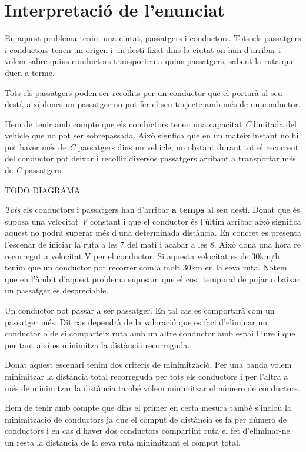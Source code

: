 \section{Interpretació de l'enunciat}

En aquest problema tenim una ciutat, passatgers i conductors. Tots els passatgers i conductors
tenen un origen i un destí fixat dins la ciutat on han d'arribar i volem sabre quins conductors
transporten a quins passatgers, sabent la ruta que duen a terme.

Tots els passatgers poden ser recollits per un conductor que el portarà al seu destí,
així doncs un passatger no pot fer el seu tarjecte amb més de un conductor.

Hem de tenir amb compte que els conductors tenen una capacitat \emph{C} limitada del vehicle que no pot ser
sobrepassada. Això signfica que en un mateix instant no hi pot haver més de \emph{C} passatgers dins un vehicle,
no obstant durant tot el recorreut del conductor pot deixar i recollir diversos passatgers arribant a transportar
més de \emph{C} passatgers.


TODO DIAGRAMA

\emph{Tots} els conductors i passatgers han d'arribar \textbf{a temps} al seu destí. Donat que és
suposa una velocitat \emph{V} constant i que el conductor és l'últim arribar això significa aquest no podrà
superar més d'una determinada distància. En concret es presenta l'escenar de iniciar la ruta a les 7 del mati
i acabar a les 8. Això dona una hora re recorregut a velocitat V per el conductor. Si aquesta velocitat es
de 30km/h tenim que un conductor pot recorrer com a molt 30km en la seva ruta. Notem que en l'àmbit
d'aquest problema suposam que el cost temporal de pujar o baixar un passatger és despreciable.

Un conductor pot passar a ser passatger. En tal cas es comportarà com un passatger més. Dit cas
dependrà de la valoració que es faci d'eliminar un conductor o de si comparteix ruta amb un altre
conductor amb espai lliure i que per tant així es minimitza la distància recorreguda.

Donat aquest escenari tenim dos criteris de minimització.
Per una banda volem minimitzar la distància total recorreguda per tots els conductors i per l'altra
a més de minimitzar la distància també volem minimitzar el número de conductors.

Hem de tenir amb compte que dins el primer en certa mesura també s'inclou la minimització de conductors
ja que el còmput de distància es fa per número de conductors i en cas d'haver dos conductors compartint
ruta el fet d'eliminar-ne un resta la distància de la seva ruta minimitzant el còmput total.

